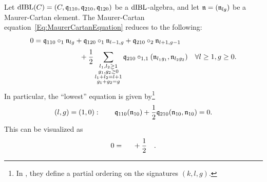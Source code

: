 \documentclass[\MainFolder/Text.tex]{subfiles}
\begin{document}
\begin{Proposition}\label{Prop:dIBL}
Let $\mathrm{dIBL}(C) = (C,\mathfrak{q}_{110},\mathfrak{q}_{210},\mathfrak{q}_{120})$ be a $\mathrm{dIBL}$-algebra, and let $\mathfrak{n} = (\mathfrak{n}_{lg})$ be a Maurer-Cartan element. The Maurer-Cartan equation~\eqref{Eq:MaurerCartanEquation} reduces to the following:
\[ 
\begin{multlined}[b] 0 = \OPQ_{110}\circ_1 \PMC_{lg} + \OPQ_{120} \circ_1 \PMC_{l-1,g} +  \OPQ_{210}\circ_2 \PMC_{l+1,g-1} \\[\jot]+  \frac{1}{2}\sum_{\substack{l_1, l_2\ge 1 \\ g_1, g_2 \ge 0 \\ l_1 + l_2 = l + 1 \\ g_1 + g_2 = g}} \OPQ_{210}\circ_{1,1}(\PMC_{l_1 g_1}, \PMC_{l_2 g_2}) \end{multlined}\quad \forall l\ge1 , g\ge 0.
\]
In particular, the ``lowest'' equation is given by\footnote{In \cite[Definition 2.4.]{Cieliebak2015}, they define a partial ordering on the signatures $(k,l,g)$.}
\begin{equation} \label{Eq:MCEq}
(l,g) = (1,0): \qquad \mathfrak{q}_{110}(\mathfrak{n}_{10}) + \frac{1}{2}\mathfrak{q}_{210}(\mathfrak{n}_{10}, \mathfrak{n}_{10}) = 0.
\end{equation}
This can be visualized as
{\begingroup \def\dist{0.25} %
  \def\rad{0.5} %
  \def\ecc{0.1} %
  \def\hght{1} %
  \def\dif{1.5} %
  \def\radO{\rad} %
  \def\eccO{\ecc} %
  \def\hghtO{2*\hght+\dist} %
  \def\difO{\dif} %
  \def\gencanc{0.05} %
  \def\genecc{20} %
  \def\genrad{0.45} %
\[0 =\quad \vcenterline{}\; + \frac{1}{2} \quad \vcenterline{}. \]
\endgroup}


\end{Proposition}
\end{document}

